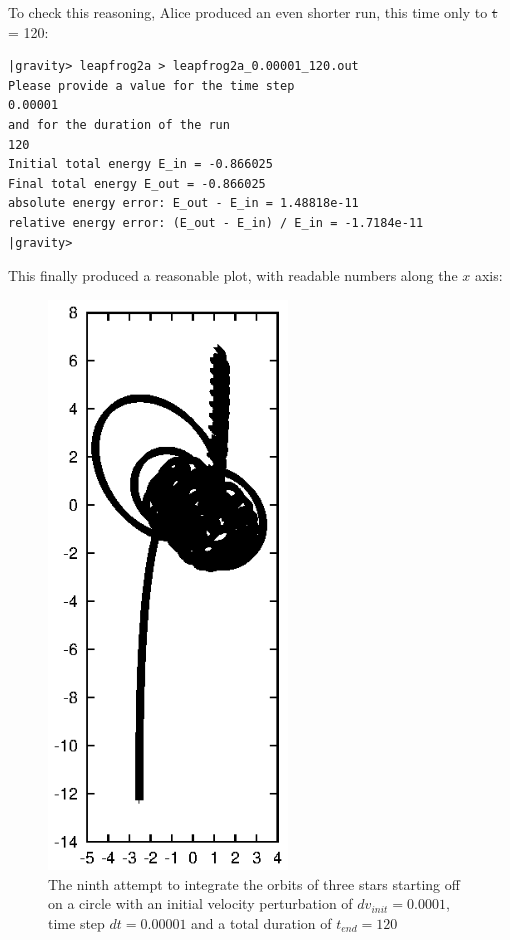 To check this reasoning, Alice produced an even shorter run, this time
only to {\st t = 120}:

\begin{small}
\begin{verbatim}
|gravity> leapfrog2a > leapfrog2a_0.00001_120.out
Please provide a value for the time step
0.00001
and for the duration of the run
120
Initial total energy E_in = -0.866025
Final total energy E_out = -0.866025
absolute energy error: E_out - E_in = 1.48818e-11
relative energy error: (E_out - E_in) / E_in = -1.7184e-11
|gravity>
\end{verbatim}
\end{small}

This finally produced a reasonable plot, with readable numbers along
the $x$ axis:

\begin{figure}[htb]
\centering
\includegraphics[width=2.5in]{chap5/leapfrog2a_0.00001_120.ps}
\caption[Three stars on a circle, leapfrog, $dv_{init}=0.0001$, $dt = 0.00001$,
$t_{end} = 120$]
{The ninth attempt to integrate the orbits of three stars
starting off on a circle with an initial velocity perturbation of 
$dv_{init}=0.0001$, time step $dt = 0.00001$ and a total duration of
$t_{end} = 120$}
\label{fig:leap2a-0.00001-120}
\end{figure}

